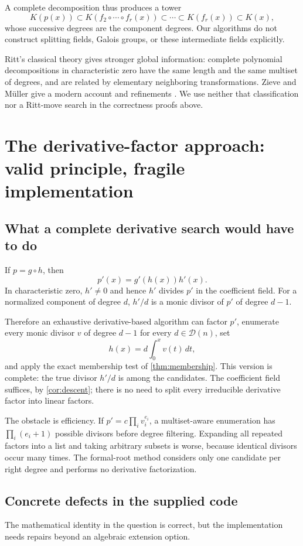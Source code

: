 \documentclass[11pt,a4paper]{article}
\theoremstyle{definition}
\newcommand{\calD}{\mathcal D}
\begin{document}
A complete decomposition thus produces a tower
\[
 K(p(x))\subset K(f_2\circ\cdots\circ f_r(x))
 \subset\cdots\subset K(f_r(x))\subset K(x),
\]
whose successive degrees are the component degrees. Our algorithms do not construct splitting fields, Galois groups, or these intermediate fields explicitly.

Ritt's classical theory gives stronger global information: complete polynomial decompositions in characteristic zero have the same length and the same multiset of degrees, and are related by elementary neighboring transformations. Zieve and M\"uller give a modern account and refinements \cite{zievemueller}. We use neither that classification nor a Ritt-move search in the correctness proofs above.

\section{The derivative-factor approach: valid principle, fragile implementation}
\subsection{What a complete derivative search would have to do}
If $p=g\circ h$, then
\[
 p'(x)=g'(h(x))h'(x).
\]
In characteristic zero, $h'\ne0$ and hence $h'$ divides $p'$ in the coefficient field. For a normalized component of degree $d$, $h'/d$ is a monic divisor of $p'$ of degree $d-1$.

Therefore an exhaustive derivative-based algorithm can factor $p'$, enumerate every monic divisor $v$ of degree $d-1$ for every $d\in\calD(n)$, set
\[
 h(x)=d\int_0^x v(t)\,dt,
\]
and apply the exact membership test of \cref{thm:membership}. This version is complete: the true divisor $h'/d$ is among the candidates. The coefficient field suffices, by \cref{cor:descent}; there is no need to split every irreducible derivative factor into linear factors.

The obstacle is efficiency. If $p'=c\prod_i v_i^{e_i}$, a multiset-aware enumeration has $\prod_i(e_i+1)$ possible divisors before degree filtering. Expanding all repeated factors into a list and taking arbitrary subsets is worse, because identical divisors occur many times. The formal-root method considers only one candidate per right degree and performs no derivative factorization.

\subsection{Concrete defects in the supplied code}
The mathematical identity in the question is correct, but the implementation needs repairs beyond an algebraic extension option.
\end{document}

